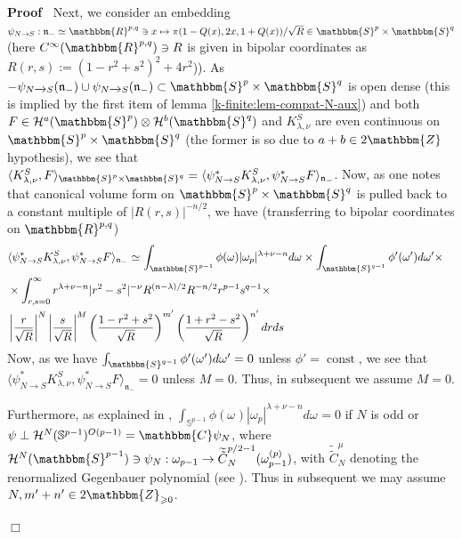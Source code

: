 \documentclass{article}
\newcommand{\assign}{:=}
\newcommand{\tmop}[1]{\ensuremath{\operatorname{#1}}}
\newenvironment{proof}{\noindent\textbf{Proof\ }}{\hspace*{\fill}$\Box$\medskip}
\numberwithin{definition}{section}
\numberwithin{lemma}{section}
\numberwithin{proposition}{section}
{\theorembodyfont{\rmfamily}\newtheorem{remark}{Remark}
\numberwithin{remark}{section}
}
\begin{document}
\begin{proof}
  Next, we consider an embedding $\psi_{N \rightarrow S} : \mathfrak{n}_-
  \simeq \mathbbm{R}^{p, q} \ni x \mapsto \pi ( 1 - Q ( x), 2 x, 1 + Q ( x)) /
  \sqrt{R} \in \mathbbm{S}^p \times \mathbbm{S}^q$ (here $C^{\infty} (
  \mathbbm{R}^{p, q}) \ni R$ is given in bipolar coordinates as $R ( r, s)
  \assign ( 1 - r^2 + s^2)^2 + 4 r^2$)). As $- \psi_{N \xrightarrow{} S} (
  \mathfrak{n}_-) \cup \psi_{N \xrightarrow{} S} ( \mathfrak{n}_-) \subset
  \mathbbm{S}^p \times \mathbbm{S}^q$ is open dense (this is implied by the
  first item of lemma \ref{k-finite:lem-compat-N-aux}) and both $F \in
  \mathcal{H}^a ( \mathbbm{S}^p) \otimes \mathcal{H}^b ( \mathbbm{S}^q)$ and
  $K_{\lambda, \nu}^S$ are even continuous on $\mathbbm{S}^p \times
  \mathbbm{S}^q$ (the former is so due to $a + b \in 2\mathbbm{Z}$
  hypothesis), we see that $\langle K_{\lambda, \nu}^S, F
  \rangle_{\mathbbm{S}^p \times \mathbbm{S}^q} = \langle \psi_{N \rightarrow
  S}^{\ast} K_{\lambda, \nu}^S, \psi_{N \rightarrow S}^{\ast} F
  \rangle_{\mathfrak{n}_-}$. Now, as one notes that canonical volume form on
  $\mathbbm{S}^p \times \mathbbm{S}^q$ is pulled back to a constant multiple
  of $| R ( r, s) |^{- n / 2}$, we have (transferring to bipolar coordinates
  on $\mathbbm{R}^{p, q}$)
  \begin{eqnarray}
    & \langle \psi_{N \rightarrow S}^{\ast} K_{\lambda, \nu}^S, \psi_{N
    \rightarrow S}^{\ast} F \rangle_{\mathfrak{n}_-} \simeq
    \int_{\mathbbm{S}^{p - 1}} \phi ( \omega) | \omega_p |^{\lambda + \nu - n}
    d \omega_{} \times \int_{\mathbbm{S}^{q - 1}} \phi' ( \omega') d \omega'
    \times &  \nonumber\\
    & \times \int_{r, s = 0}^{\infty} r^{\lambda + \nu - n} | r^2 - s^2 |^{-
    \nu} R^{( n - \lambda) / 2} R^{- n / 2} r^{p - 1} s^{q - 1} \times & 
    \nonumber\\
    & \left| \frac{r}{\sqrt{R}} \right|^N \left| \frac{s}{\sqrt{R}} \right|^M
    \left( \frac{1 - r^2 + s^2}{\sqrt{R}} \right)^{m'} \left( \frac{1 + r^2 -
    s^2}{\sqrt{R}} \right)^{n'} d r d s &  \nonumber
  \end{eqnarray}
  Now, as we have $\int_{\mathbbm{S}^{q - 1}} \phi' ( \omega') d \omega' = 0$
  unless $\phi' = \tmop{const}$, we see that $\langle \psi_{N \rightarrow
  S}^{\ast} K_{\lambda, \nu}^S, \psi_{N \rightarrow S}^{\ast} F
  \rangle_{\mathfrak{n}_-} = 0$ unless $M = 0$. Thus, in subsequent we assume
  $M = 0$.
  
  Furthermore, as explained in {\cite[lem 7.6]{kobayashi2015symmetry}},
  $\int_{\mathbb{S}^{p - 1}} \phi (\omega_{}) | \omega_p^{} |^{\lambda + \nu -
  n} d \omega_{} = 0$ if $N$ is odd or $\psi \perp \mathcal{H}^N (
  \mathbb{S}^{p - 1})^{O (p - 1)} =\mathbbm{C} \psi_N$, where $\mathcal{H}^N (
  \mathbbm{S}^{p - 1}) \ni \psi_N : \omega_{p - 1} \rightarrow
  \widetilde{\tilde{C}}_N^{p / 2 - 1} ( \omega_{p - 1}^{( p)})$, with
  $\widetilde{\tilde{C}}_N^{\mu}$ denoting the renormalized Gegenbauer
  polynomial (see {\cite[(16.4)]{kobayashi2015symmetry}}). Thus in subsequent
  we may assume $N, m' + n' \in 2\mathbbm{Z}_{\geqslant 0}$.
  

\end{proof}
\end{document}
